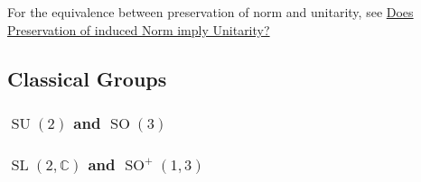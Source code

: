\documentclass{article}
\begin{document}
For the equivalence between preservation of norm and unitarity, see \href{https://math.stackexchange.com/questions/3313702/does-preservation-of-induced-norm-imply-unitarity}{Does Preservation of induced Norm imply Unitarity?}

\subsection{Classical Groups}

\subsubsection{\texorpdfstring{$\operatorname{SU}(2)$ and $\operatorname{SO}(3)$}{SU(2) and SO(3)}}

\subsubsection{\texorpdfstring{$\operatorname{SL}(2,\mathbb{C})$ and $\operatorname{SO}^+(1,3)$}{SL(2) and SO+(1,3)}}

% 
% 
\end{document}
